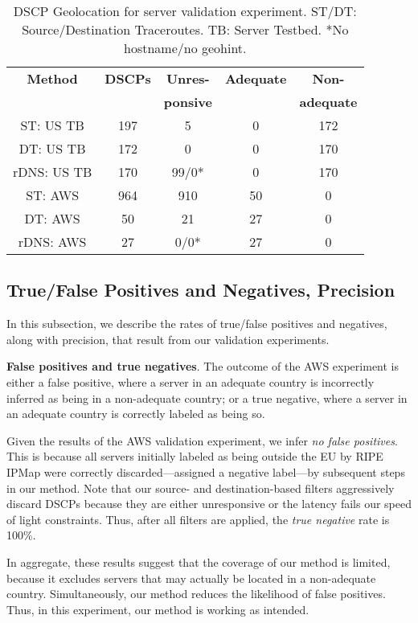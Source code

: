 \begin{table}
  \caption{DSCP Geolocation for server validation experiment. 
ST/DT: Source/Destination Traceroutes. 
TB: Server Testbed. *No hostname/no geohint.}
  \label{tab:testbedgeo}
  \begin{tabular}{ccccc}
    \toprule
    \textbf{Method} & \textbf{DSCPs} & \textbf{Unres-} & \textbf{Adequate} & \textbf{Non-}\\
     &  & \textbf{ponsive} &  & \textbf{adequate} \\
    \toprule
    ST: US TB & 197  & 5 & 0 & 172 \\
    DT: US TB & 172 & 0 & 0& 170 \\
    rDNS: US TB & 170 & 99/0* & 0 & 170 \\
    \midrule
    ST: AWS & 964  & 910 & 50  & 0 \\
    DT: AWS & 50  & 21 & 27  & 0 \\
    rDNS: AWS & 27  & 0/0* & 27  & 0 \\
  \bottomrule
\end{tabular}
\end{table}


\subsection{True/False Positives and Negatives, Precision}
In this subsection, we describe the rates of
true/false positives and negatives,
along with precision, that result
from our validation experiments.

\textbf{False positives and true negatives}. 
The outcome of the AWS experiment is either a false positive,
where a server 
in an adequate country is incorrectly inferred as being in a
non-adequate country; or a true negative,
where a server in an adequate country is correctly labeled as being so.

Given the results of the AWS validation experiment, 
we infer \textit{no false positives}.
This is because all servers initially labeled as being outside the 
EU by RIPE IPMap were correctly discarded---assigned a negative label---by 
subsequent steps in our method. 
Note that our source- and destination-based filters 
aggressively discard DSCPs because they are
either unresponsive or the latency fails our speed of light constraints.
Thus, after all filters are applied, 
the \textit{true negative} rate is 100\%.

In aggregate, these results suggest that the coverage of our method is limited,
because it excludes servers that may actually be located 
in a non-adequate country. 
Simultaneously, our method reduces the likelihood of false positives. 
Thus, in this experiment, our method is working as intended.


